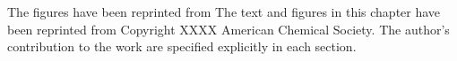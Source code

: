 The figures have been reprinted from %
The text and figures in this chapter have been reprinted from %
Copyright XXXX American Chemical Society. %
The author's contribution to the work are specified explicitly in each section.
